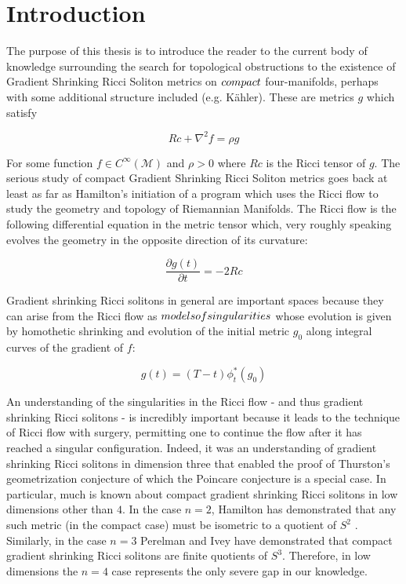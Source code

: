 \documentclass[openany, amssymb, psamsfonts]{amsart}
\theoremstyle{definition}
\numberwithin{equation}{section}
\begin{document}
\section{Introduction}

    The purpose of this thesis is to introduce the reader to the current body of knowledge surrounding the search for topological obstructions to the existence of Gradient Shrinking Ricci Soliton metrics on $\emph{compact}$ four-manifolds, perhaps with some additional structure included (e.g. Kähler). These are metrics $g$ which satisfy 
    
    $$Rc + \nabla^2f = \rho g$$
    
    For some function $f\in C^\infty(\mathcal{M})$ and $\rho > 0$ where $Rc$ is the Ricci tensor of $g$. The serious study of compact Gradient Shrinking Ricci Soliton metrics goes back at least as far as Hamilton's initiation of a program which uses the Ricci flow to study the geometry and topology of Riemannian Manifolds. The Ricci flow is the following differential equation in the metric tensor which, very roughly speaking evolves the geometry in the opposite direction of its curvature:
    
    $$\frac{\partial g(t)}{\partial t} = -2Rc$$
    
    Gradient shrinking Ricci solitons in general are important spaces because they can arise from the Ricci flow as $\emph{models of singularities}$ whose evolution is given by homothetic shrinking and evolution of the initial metric $g_0$ along integral curves of the gradient of $f$:
    
    $$g(t) = (T - t)\phi^*_{t}(g_0)$$
    
    An understanding of the singularities in the Ricci flow - and thus gradient shrinking Ricci solitons - is incredibly important because it leads to the technique of Ricci flow with surgery, permitting one to continue the flow after it has reached a singular configuration. Indeed, it was an understanding of gradient shrinking Ricci solitons in dimension three that enabled the proof of Thurston's geometrization conjecture of which the Poincare conjecture is a special case. In particular, much is known about compact gradient shrinking Ricci solitons in low dimensions other than $4$. In the case $n=2$, Hamilton has demonstrated that any such metric (in the compact case) must be isometric to a quotient of $S^2$ \cite{ham}. Similarly, in the case $n=3$ Perelman \cite{perl} and Ivey \cite{ivey} have demonstrated that compact gradient shrinking Ricci solitons are finite quotients of $S^3$. Therefore, in low dimensions the $n=4$ case represents the only severe gap in our knowledge. 
\end{document}
